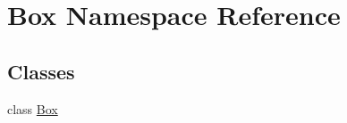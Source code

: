 \hypertarget{namespace_box}{}\section{Box Namespace Reference}
\label{namespace_box}
\subsection*{Classes}
\begin{DoxyCompactItemize}
\item 
class \hyperlink{class_box_1_1_box}{Box}
\end{DoxyCompactItemize}
